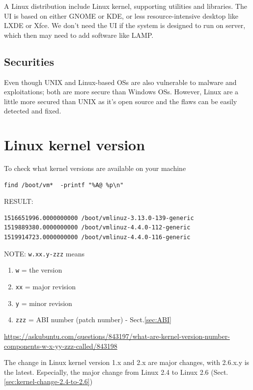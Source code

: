 A Linux distribution include Linux kernel, supporting utilities and libraries.
The UI is based on either GNOME or KDE, or less resource-intensive desktop like
LXDE or Xfce. We don't need the UI if the system is designed to run on server,
which then may need to add software like LAMP. 



\subsection{Securities}

Even though UNIX and Linux-based OSs are also vulnerable to malware and
exploitations; both are more secure than Windows OSs. However, Linux are a
little more secured than UNIX as it's open source and the flaws can be easily
detected and fixed.



\section{Linux kernel version}
\label{sec:Linux_kernel}
\label{sec:kernel}

To check what kernel versions are available on your machine
\begin{verbatim}
find /boot/vm*  -printf "%A@ %p\n"
\end{verbatim}
RESULT:
\begin{verbatim}
1516651996.0000000000 /boot/vmlinuz-3.13.0-139-generic
1519889380.0000000000 /boot/vmlinuz-4.4.0-112-generic
1519914723.0000000000 /boot/vmlinuz-4.4.0-116-generic
\end{verbatim}
NOTE: \verb!w.xx.y-zzz! means
\begin{enumerate}
  \item \verb!w! = the version
  
  \item \verb!xx! = major revision 
  
  \item \verb!y! = minor revision 
  
  \item \verb!zzz! = ABI number (patch number) - Sect.\ref{sec:ABI}
\end{enumerate}
\url{https://askubuntu.com/questions/843197/what-are-kernel-version-number-components-w-x-yy-zzz-called/843198}

The change in Linux kernel version 1.x and 2.x are major changes, with 2.6.x.y
is the latest. Especially, the major change from Linux 2.4 to Linux 2.6
(Sect.\ref{sec:kernel-change-2.4-to-2.6})

